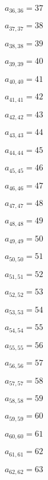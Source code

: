 \documentclass[a4paper,12pt]{article}
\begin{document}
$a _{ 36, 36 } = 37$

$a _{ 37, 37 } = 38$

$a _{ 38, 38 } = 39$

$a _{ 39, 39 } = 40$

$a _{ 40, 40 } = 41$

$a _{ 41, 41 } = 42$

$a _{ 42, 42 } = 43$

$a _{ 43, 43 } = 44$

$a _{ 44, 44 } = 45$

$a _{ 45, 45 } = 46$

$a _{ 46, 46 } = 47$

$a _{ 47, 47 } = 48$

$a _{ 48, 48 } = 49$

$a _{ 49, 49 } = 50$

$a _{ 50, 50 } = 51$

$a _{ 51, 51 } = 52$

$a _{ 52, 52 } = 53$

$a _{ 53, 53 } = 54$

$a _{ 54, 54 } = 55$

$a _{ 55, 55 } = 56$

$a _{ 56, 56 } = 57$

$a _{ 57, 57 } = 58$

$a _{ 58, 58 } = 59$

$a _{ 59, 59 } = 60$

$a _{ 60, 60 } = 61$

$a _{ 61, 61 } = 62$

$a _{ 62, 62 } = 63$
\end{document}
